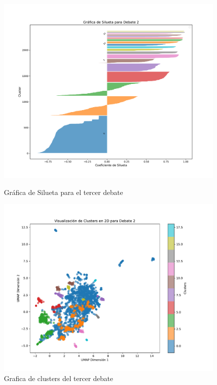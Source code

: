 \documentclass[10pt, a4paper]{article}
\begin{document}
	\begin{figure}[h!]
		\centering
		\begin{minipage}{0.49\textwidth} %
			\includegraphics[width=\linewidth]{silhouette_debate2.pdf} 
			\caption{Gráfica de Silueta para el tercer debate}
			\label{fig:silDeb3}
		\end{minipage}
		\hfill %
		\begin{minipage}{0.49\textwidth}
			\includegraphics[width=\linewidth]{clusters_debate2.pdf}
			\caption{Grafica de clusters del tercer debate}
			\label{fig:clustDeb3}
		\end{minipage}
	\end{figure}
	
\end{document}

